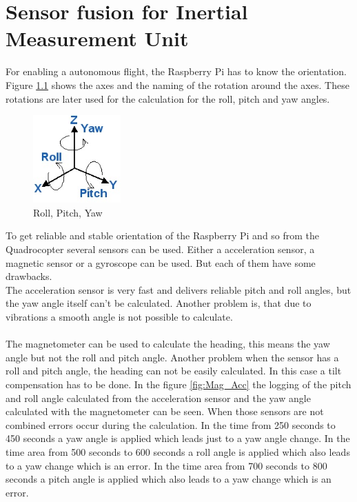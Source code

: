 \chapter{Sensor fusion for Inertial Measurement Unit}
\label{sec:sensorFusion}

For enabling a autonomous flight, the Raspberry Pi has to know the orientation. Figure \ref{fig:angles} shows the axes and the naming of the rotation around the axes. These rotations are later used for the calculation for the roll, pitch and yaw angles.

\begin{figure}[H]
	\centering\includegraphics[width=0.3\textwidth]{fig/Kal_Comp/Roll_pitch_yaw}
	\caption{Roll, Pitch, Yaw \cite{doc:boreg}}
	\label{fig:angles}
\end{figure}

To get reliable and stable orientation of the Raspberry Pi and so from the Quadrocopter several sensors can be used. Either a acceleration sensor, a magnetic sensor or a gyroscope can be used. But each of them have some drawbacks.\\
The acceleration sensor is very fast and delivers reliable pitch and roll angles, but the yaw angle itself can't be calculated. Another problem is, that due to vibrations a smooth angle is not possible to calculate.\\\\
The magnetometer can be used to calculate the heading, this means the yaw angle but not the roll and pitch angle. Another problem when the sensor has a roll and pitch angle, the heading can not be easily calculated. In this case a tilt compensation has to be done. In the figure \ref{fig:Mag_Acc} the logging of the pitch and roll angle calculated from the acceleration sensor and the yaw angle calculated with the magnetometer can be seen. When those sensors are not combined errors occur during the calculation. In the time from 250 seconds to 450 seconds a yaw angle is applied which leads just to a yaw angle change. In the time area from 500 seconds to 600 seconds a roll angle is applied which also leads to a yaw change which is an error. In the time area from 700 seconds to 800 seconds a pitch angle is applied which also leads to a yaw change which is an error.\\

